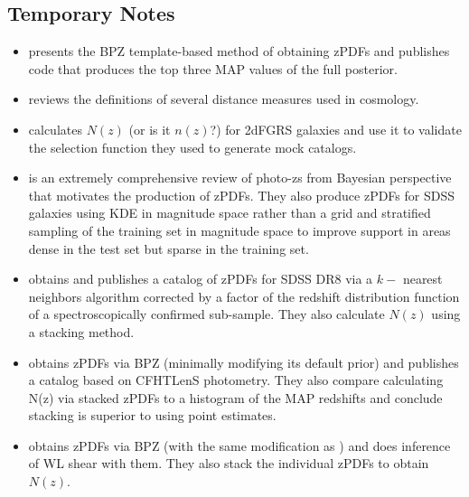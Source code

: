 \documentclass[preprint]{aastex}
\begin{document}
\clearpage
\subsection*{Temporary Notes}

\begin{itemize}
redshifts.
\item \citet{ben98} presents the BPZ template-based method of obtaining zPDFs 
and publishes code that produces the top three MAP values of the full 
posterior.  
\item \citet{hog99} reviews the definitions of several distance measures used 
in cosmology.
\item \citet{nor01} calculates $N(z)$ (or is it $n(z)$?) for 2dFGRS galaxies 
and use it to validate the selection function they used to generate mock 
catalogs.
\item \citet{bud08} is an extremely comprehensive review of photo-zs from 
Bayesian perspective that motivates the production of zPDFs. They also produce 
zPDFs for SDSS galaxies using KDE in magnitude space rather than a grid and 
stratified sampling of the training set in magnitude space to improve support 
in areas dense in the test set but sparse in the training set.
\item \citet{she11} obtains and publishes a catalog of zPDFs for SDSS DR8 via a 
$k-$ nearest neighbors algorithm corrected by a factor of the redshift 
distribution function of a spectroscopically confirmed sub-sample.  They also 
calculate $N(z)$ using a stacking method.
\item \citet{hil11} obtains zPDFs via BPZ (minimally modifying its default 
prior) and publishes a catalog based on CFHTLenS photometry.  They also compare 
calculating N(z) via stacked zPDFs to a histogram of the MAP redshifts and 
conclude stacking is superior to using point estimates.
\item \citet{kel12} obtains zPDFs via BPZ (with the same modification as 
\citet{hil11}) and does inference of WL shear with them.  They also stack the 
individual zPDFs to obtain $N(z)$.

\end{itemize}
\end{document}
